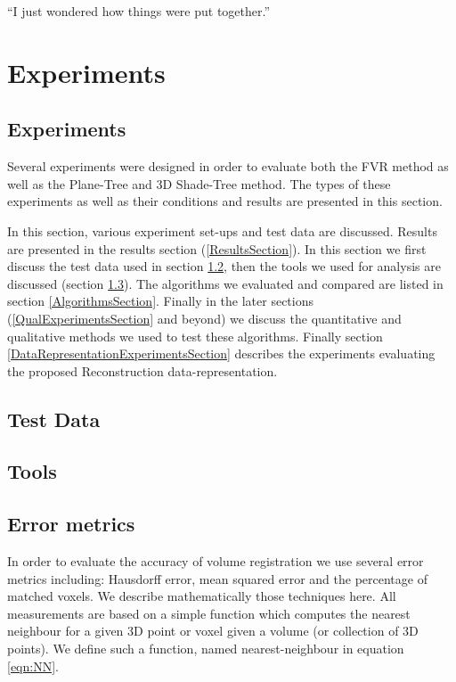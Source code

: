 \begin{savequote}[8cm]
  ``I just wondered how things were put together.''
\end{savequote}
\makeatletter
\chapter{Experiments}
\label{ch:Experiments}

\section{Experiments}

Several experiments were designed in order to evaluate both the FVR method as well as the Plane-Tree and 3D Shade-Tree method. The types of these experiments as well as their conditions and results are presented in this section. 

In this section, various experiment set-ups and test data are discussed. Results are presented in the results section (\ref{ResultsSection}). In this section we first discuss the test data used in section \ref{TestDataSection}, then the tools we used for analysis are discussed (section \ref{ToolsSection}). The algorithms we evaluated and compared are listed in section \ref{AlgorithmsSection}. Finally in the later sections (\ref{QualExperimentsSection} and beyond) we discuss the quantitative and qualitative methods we used to test these algorithms. Finally section \ref{DataRepresentationExperimentsSection} describes the experiments evaluating the proposed Reconstruction data-representation. 

\section{Test Data}
\label{TestDataSection}


\section{Tools}
\label{ToolsSection}


\section{Error metrics}

\label{metricsSection}

In order to evaluate the accuracy of volume registration we use several error metrics including: Hausdorff error, mean squared error and the percentage of matched voxels. We describe mathematically those techniques here. All measurements are based on a simple function which computes the nearest neighbour for a given 3D point or voxel given a volume (or collection of 3D points). We define such a function, named nearest-neighbour in equation \ref{eqn:NN}.

